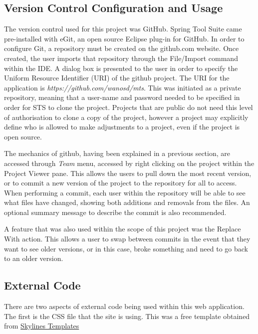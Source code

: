 \subsection{Version Control Configuration and Usage}

The version control used for this project was GitHub. Spring Tool Suite came pre-installed with eGit, an open source Eclipse plug-in for GitHub. In order to configure Git, a repository must be created on the github.com website. Once created, the user imports that repository through the File/Import command within the IDE. A dialog box is presented to the user in order to specify the Uniform Resource Identifier (URI) of the github project. The URI for the application is \textit{https://github.com/wanosd/mts}. This was initiated as a private repository, meaning that a user-name and password needed to be specified in order for STS to clone the project. Projects that are public do not need this level of authorisation to clone a copy of the project, however a project may explicitly define who is allowed to make adjustments to a project, even if the project is open source.

The mechanics of github, having been explained in a previous section, are accessed through \textit{Team} menu, accessed by right clicking on the project within the Project Viewer pane. This allows the users to pull down the most recent version, or to commit a new version of the project to the repository for all to access. When performing a commit, each user within the repository will be able to see what files have changed, showing both additions and removals from the files. An optional summary message to describe the commit is also recommended. 

A feature that was also used within the scope of this project was the Replace With action. This allows a user to swap between commits in the event that they want to see older versions, or in this case, broke something and need to go back to an older version.

\subsection{External Code}

There are two aspects of external code being used within this web application. The first is the CSS file that the site is using. This was a free template obtained from \href{http://skylinestemplates.blogspot.ie/2011/11/greefies-solution-xhtml-and-css.html}{Skylines Templates}

